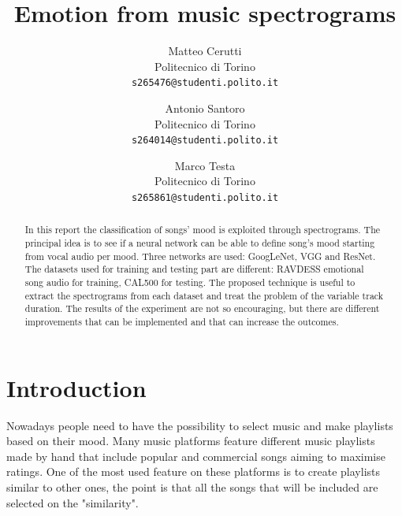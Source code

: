 \documentclass[10pt,twocolumn,letterpaper]{article}
\begin{document}
\title{Emotion from music spectrograms}

\author{Matteo Cerutti\\
Politecnico di Torino\\
{\tt\small s265476@studenti.polito.it}
\and
Antonio Santoro\\
Politecnico di Torino\\
{\tt\small s264014@studenti.polito.it}
\and
Marco Testa\\
Politecnico di Torino\\
{\tt\small s265861@studenti.polito.it}
}


\maketitle

\begin{abstract}
   In this report the classification of songs' mood is exploited through spectrograms. The principal idea is to see if a neural network can be able to define song's mood starting from vocal audio per mood. Three networks are used: GoogLeNet, VGG and ResNet. The datasets used for training and testing part are different: RAVDESS emotional song audio for training, CAL500 for testing. The proposed technique is useful to extract the spectrograms from each dataset and treat the problem of the variable track duration. The results of the experiment are not so encouraging, but there are different improvements that can be implemented and that can increase the outcomes.
\end{abstract}

\section{Introduction}

Nowadays people need to have the possibility to select music and make playlists based on their mood. Many music platforms feature different music playlists made by hand that include popular and commercial songs aiming to maximise ratings. One of the most used feature on these platforms is to create playlists similar to other ones, the point is that all the songs that will be included are selected on the "similarity".
\end{document}
